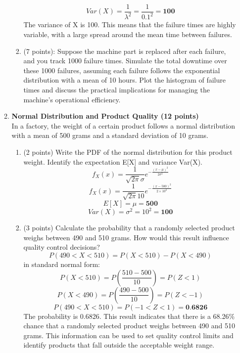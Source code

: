 \documentclass[a3paper,12pt]{article} %
\begin{document}
\begin{enumerate}
\begin{enumerate}
\begin{enumerate}
            \[
                Var(X) = \frac{1}{\lambda^2} = \frac{1}{0.1^2} = \textbf{100}
            \]
            The variance of X is 100. This means that the failure times are highly variable, with a large spread around the mean time between failures.
            \item (7 points): Suppose the machine part is replaced after each failure, and you track 1000 failure
            times. Simulate the total downtime over these 1000 failures, assuming each failure follows the
            exponential distribution with a mean of 10 hours. Plot the histogram of failure times and discuss
            the practical implications for managing the machine’s operational efficiency.
        \end{enumerate}
        \item \textbf{Normal Distribution and Product Quality (12 points)}
        \\ In a factory, the weight of a certain product follows a normal distribution with a mean of 500 grams
        and a standard deviation of 10 grams.
        \begin{enumerate}
            \item (2 points) Write the PDF of the normal distribution for this product weight. Identify the expectation E[X] and variance Var(X).
            \[
                f_X(x) = \frac{1}{\sqrt{2\pi}\sigma} e^{-\frac{(x - \mu)^2}{2\sigma^2}}
            \]
            \[
                f_X(x) = \frac{1}{\sqrt{2\pi}10} e^{-\frac{(x - 500)^2}{2 \times 10^2}}
            \]
            \[
                E[X] = \mu = \textbf{500}
            \]
            \[
                Var(X) = \sigma^2 = 10^2 = \textbf{100}
            \]
            \item (3 points) Calculate the probability that a randomly selected product weighs between 490 and
            510 grams. How would this result influence quality control decisions?
            \[
                P(490 < X < 510) = P(X < 510) - P(X < 490)
            \]
            in standard normal form:
            \[
                P(X < 510) = P\left(\frac{510 - 500}{10}\right) = P(Z < 1)
            \]
            \[
                P(X < 490) = P\left(\frac{490 - 500}{10}\right) = P(Z < -1)
            \]
            \[
                P(490 < X < 510) = P(-1 < Z < 1)  = \textbf{0.6826}
            \]
            The probability is 0.6826. This result indicates that there is a 68.26\% chance that a randomly selected product weighs between 490 and 510 grams. This information can be used to set quality control limits and identify products that fall outside the acceptable weight range.

\end{enumerate}
\end{enumerate}
\end{enumerate}
\end{document}
